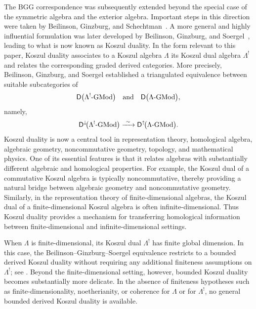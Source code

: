 \documentclass[11pt]{article}
\theoremstyle{definition}
\theoremstyle{remark}
\begin{document}
The BGG correspondence was subsequently extended beyond the special case of the symmetric algebra and the exterior algebra. Important steps in this direction were taken by Beilinson, Ginzburg, and Schechtman~\cite{4}. A more general and highly influential formulation was later developed by Beilinson, Ginzburg, and Soergel~\cite{5}, leading to what is now known as Koszul duality. In the form relevant to this paper, Koszul duality associates to a Koszul algebra \(\Lambda\) its Koszul dual algebra \(\Lambda^{!}\) and relates the corresponding graded derived categories. More precisely, Beilinson, Ginzburg, and Soergel established a triangulated equivalence between suitable subcategories of \[ \mathsf{D}\bigl(\Lambda^{!}\textup{-}\mathrm{GMod}\bigr) \quad\text{and}\quad \mathsf{D}\bigl(\Lambda\textup{-}\mathrm{GMod}\bigr), \] namely, \[ \mathsf{D}^{\downarrow}\!\bigl(\Lambda^{!}\textup{-}\mathrm{GMod}\bigr) \xrightarrow{\ \sim\ } \mathsf{D}^{\uparrow}\!\bigl(\Lambda\textup{-}\mathrm{GMod}\bigr). \] Koszul duality is now a central tool in representation theory, homological algebra, algebraic geometry, noncommutative geometry, topology, and mathematical physics. One of its essential features is that it relates algebras with substantially different algebraic and homological properties. For example, the Koszul dual of a commutative Koszul algebra is typically noncommutative, thereby providing a natural bridge between algebraic geometry and noncommutative geometry. Similarly, in the representation theory of finite-dimensional algebras, the Koszul dual of a finite-dimensional Koszul algebra is often infinite-dimensional. Thus Koszul duality provides a mechanism for transferring homological information between finite-dimensional and infinite-dimensional settings. 

\medskip 

When \(\Lambda\) is finite-dimensional, its Koszul dual \(\Lambda^{!}\) has finite global dimension. In this case, the Beilinson--Ginzburg--Soergel equivalence restricts to a bounded derived Koszul duality without requiring any additional finiteness assumptions on \(\Lambda^{!}\); see \cite[Theorem~3.8]{8}. Beyond the finite-dimensional setting, however, bounded Koszul duality becomes substantially more delicate. In the absence of finiteness hypotheses such as finite-dimensionality, noetherianity, or coherence for \(\Lambda\) or for \(\Lambda^{!}\), no general bounded derived Koszul duality is available. 

\medskip 
\end{document}
